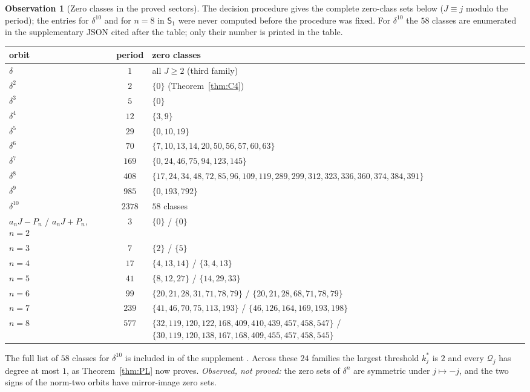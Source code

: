 \documentclass[11pt]{article}
\theoremstyle{definition}
\newtheorem{observation}[theorem]{Observation}
\begin{document}
\begin{observation}[Zero classes in the proved sectors]
\label{obs:zero-classes}
The decision procedure gives the complete zero-class sets below
($J\equiv j$ modulo the period); the entries for $\delta^{10}$ and for
$n=8$ in $\mathsf S_1$ were never computed before the procedure was
fixed.  For $\delta^{10}$ the $58$ classes are enumerated in the
supplementary JSON cited after the table; only their number is printed
in the table.
\begin{center}
\small
\begin{tabular}{@{}lcL{0.58\textwidth}@{}}
\toprule
orbit & period & zero classes\\
\midrule
$\delta$ & $1$ & all $J\geq2$ (third family)\\
$\delta^2$ & $2$ & $\{0\}$ (Theorem~\ref{thm:C4})\\
$\delta^3$ & $5$ & $\{0\}$\\
$\delta^4$ & $12$ & $\{3,9\}$\\
$\delta^5$ & $29$ & $\{0,10,19\}$\\
$\delta^6$ & $70$ & $\{7,10,13,14,20,50,56,57,60,63\}$\\
$\delta^7$ & $169$ & $\{0,24,46,75,94,123,145\}$\\
$\delta^8$ & $408$ & $\{17,24,34,48,72,85,96,109,119,\allowbreak
289,299,312,323,336,360,374,384,391\}$\\
$\delta^9$ & $985$ & $\{0,193,792\}$\\
$\delta^{10}$ & $2378$ & $58$ classes\\
\midrule
$a_nJ-P_n$ / $a_nJ+P_n$, $n=2$ & $3$ & $\{0\}$ / $\{0\}$\\
$n=3$ & $7$ & $\{2\}$ / $\{5\}$\\
$n=4$ & $17$ & $\{4,13,14\}$ / $\{3,4,13\}$\\
$n=5$ & $41$ & $\{8,12,27\}$ / $\{14,29,33\}$\\
$n=6$ & $99$ & $\{20,21,28,31,71,78,79\}$ / $\{20,21,28,68,71,78,79\}$\\
$n=7$ & $239$ & $\{41,46,70,75,113,193\}$ / $\{46,126,164,169,193,198\}$\\
$n=8$ & $577$ & $\{32,119,120,122,168,409,\allowbreak410,439,457,458,547\}$ /
$\{30,119,120,138,167,168,\allowbreak409,455,457,458,545\}$\\
\bottomrule
\end{tabular}
\end{center}
The full list of $58$ classes for $\delta^{10}$ is included in
 of the supplement \cite{LCrecord}.
Across these $24$ families the largest threshold $k^*_j$ is $2$ and
every $\mathcal Q_j$ has degree at most $1$, as Theorem~\ref{thm:PL}
now proves.  \emph{Observed, not proved:} the zero sets of $\delta^n$
are symmetric under $j\mapsto-j$, and the two signs of the norm-two
orbits have mirror-image zero sets.
\end{observation}
\end{document}
